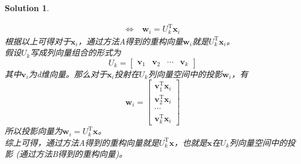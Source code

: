 \documentclass[a4paper,UTF8]{article}
\numberwithin{equation}{section}
\newtheorem*{mySol}{Solution}
\begin{document}
\begin{mySol}
\begin{enumerate}[(1)]
\begin{equation}
\begin{aligned}
\Leftrightarrow\ &\mathbf{w}_i = U_k^\mathrm{T}\mathbf{x}_i
\end{aligned}
\end{equation}
根据以上可得对于$\mathbf{x}_i$，通过方法A得到的重构向量$\mathbf{w}_i$就是$U_k^\mathrm{T}\mathbf{x}_i$。\\
假设$U_k$写成列向量组合的形式为
\begin{equation}
U_k = \left[
\begin{array}{cccc}
\mathbf{v}_1&\mathbf{v}_2&\cdots&\mathbf{v}_k 
\end{array}
\right]
\end{equation}
其中$\mathbf{v}_i$为d维向量。那么对于$\mathbf{x}_i$投射在$U_k$列向量空间中的投影$\mathbf{w}_i$，有
\begin{equation}
\mathbf{w}_i = \left[    
\begin{array}{c}   
\mathbf{v}_1^\mathrm{T}\mathbf{x}_i\\  
\mathbf{v}_2^\mathrm{T}\mathbf{x}_i\\   
\cdots\\
\mathbf{v}_k^\mathrm{T}\mathbf{x}_i
\end{array}
\right]
\end{equation}
所以投影向量为$\mathbf{w}_i=U_k^\mathrm{T}\mathbf{x}$。\\
综上可得，通过方法A得到的重构向量就是$U_k^\mathrm{T}\mathbf{x}$，也就是$\mathbf{x}$在$U_k$列向量空间中的投影 (通过方法B得到的重构向量)。
\end{enumerate}
\end{mySol}
\end{document}
